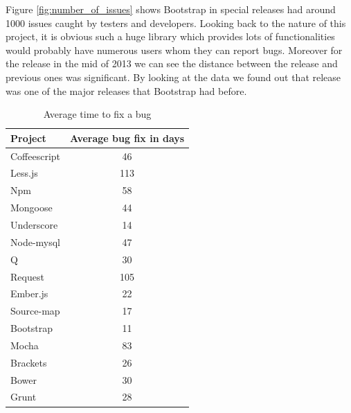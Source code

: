 Figure \ref{fig:number_of_issues} shows Bootstrap in special releases had around 1000 issues caught by testers and developers. Looking back to the nature of this project, it is obvious such a huge library which provides lots of functionalities would probably have numerous users whom they can report bugs. Moreover for the release in the mid of 2013 we can see the distance between the release and previous ones was significant. By looking at the data we found out that release was one of the major releases that Bootstrap had before. 

\begin{table}[!hbt]
	\begin{center}
		\caption{Average time to fix a bug}
		\label{tab:average_time_bugfix}
		\begin{tabular}{l| c }
			\toprule
			\textbf{Project}  & \textbf{Average bug fix in days} \\ \midrule              
			Coffeescript    & 46  \\
			Less.js         & 113 \\
			Npm             & 58  \\
			Mongoose        & 44  \\
			Underscore      & 14  \\
			Node-mysql      & 47  \\
			Q               & 30  \\
			Request         & 105 \\
			Ember.js        & 22  \\
			Source-map      & 17  \\
			Bootstrap       & 11  \\
			Mocha           & 83  \\
			Brackets        & 26  \\
			Bower           & 30  \\
			Grunt           & 28  \\  \bottomrule
		\end{tabular}
	\end{center}
\end{table}

